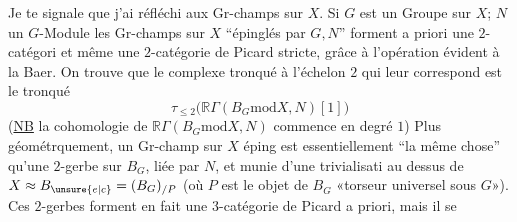 
Je te signale que j'ai réfléchi aux Gr-champs sur $X$. Si $G$ est un Groupe sur $X$; $N$ un $G$-Module les Gr-champs sur $X$ ``épinglés par $G,N$'' forment a priori une $2$-catégori et même une $2$-catégorie de Picard stricte, grâce à l'opération évident à la Baer. On trouve que le complexe  tronqué à l'échelon $2$ qui leur correspond est le tronqué
\[
\tau_{\leq 2}\bigl(\mathbb R\Gamma(B_{G}\mathbin{\mathrm{mod}}X,N)[1]\bigr)
\]
(\uline{NB} la cohomologie de $\mathbb R\Gamma(B_{G}\mathbin{\mathrm{mod}}X,N)$ commence en degré $1$) Plus géométrquement, un Gr-champ sur $X$ éping  est essentiellement ``la même chose'' qu'une $2$-gerbe sur $B_{G}$, liée par $N$, et munie d'une trivialisati au dessus de $X\approx B_{\unsure{e|c}}=(B_{G})_{/P}$ (où $P$ est le objet de $B_{G}$ «torseur universel sous $G$»). Ces $2$-gerbes forment en fait une $3$-catégorie de Picard a priori, mais il se
